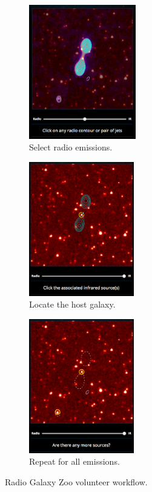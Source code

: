 \documentclass[a4paper]{article}
\begin{document}
      \begin{figure}[!ht]
        \centering
          \begin{subfigure}{0.3\textwidth}
            \includegraphics[width=\linewidth, height=2.3in]{images/rgz_radio.png}
            \caption{Select radio emissions.}
          \end{subfigure}
          \quad
          \begin{subfigure}{0.3\textwidth}
            \includegraphics[width=\linewidth, height=2.3in]{images/rgz_ir.png}
            \caption{Locate the host galaxy.}
          \end{subfigure}
          \quad
          \begin{subfigure}{0.3\textwidth}
            \includegraphics[width=\linewidth, height=2.3in]{images/rgz_done.png}
            \caption{Repeat for all emissions.}
          \end{subfigure}
          \caption{Radio Galaxy Zoo volunteer workflow.}
          \label{fig:rgz}
      \end{figure}
\end{document}
